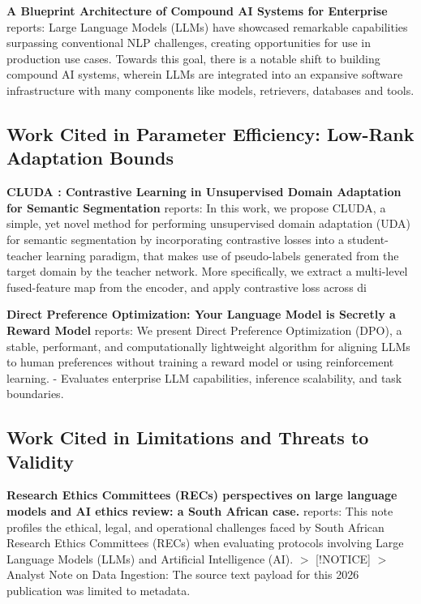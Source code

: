 \documentclass[10pt,journal,compsoc,twocolumn]{IEEEtran}
\begin{document}
\textbf{A Blueprint Architecture of Compound AI Systems for Enterprise} \cite{arxiv_2406_00584} reports: Large Language Models (LLMs) have showcased remarkable capabilities surpassing conventional NLP challenges, creating opportunities for use in production use cases. Towards this goal, there is a notable shift to building compound AI systems, wherein LLMs are integrated into an expansive software infrastructure with many components like models, retrievers, databases and tools.


\subsection{Work Cited in Parameter Efficiency: Low-Rank Adaptation Bounds}


\textbf{CLUDA : Contrastive Learning in Unsupervised Domain Adaptation for Semantic Segmentation} \cite{arxiv_2208_14227} reports: In this work, we propose CLUDA, a simple, yet novel method for performing unsupervised domain adaptation (UDA) for semantic segmentation by incorporating contrastive losses into a student-teacher learning paradigm, that makes use of pseudo-labels generated from the target domain by the teacher network. More specifically, we extract a multi-level fused-feature map from the encoder, and apply contrastive loss across di

\textbf{Direct Preference Optimization: Your Language Model is Secretly a Reward Model} \cite{arxiv_2305_18290} reports: We present Direct Preference Optimization (DPO), a stable, performant, and computationally lightweight algorithm for aligning LLMs to human preferences without training a reward model or using reinforcement learning. - Evaluates enterprise LLM capabilities, inference scalability, and task boundaries.


\subsection{Work Cited in Limitations and Threats to Validity}


\textbf{Research Ethics Committees (RECs) perspectives on large language models and AI ethics review: a South African case.} \cite{pubmed_42380865} reports: This note profiles the ethical, legal, and operational challenges faced by South African Research Ethics Committees (RECs) when evaluating protocols involving Large Language Models (LLMs) and Artificial Intelligence (AI). $>$ [!NOTICE] $>$ Analyst Note on Data Ingestion: The source text payload for this 2026 publication was limited to metadata.
\end{document}
